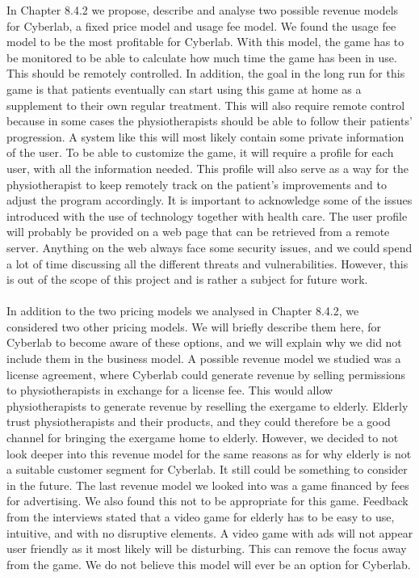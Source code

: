 In Chapter 8.4.2 we propose, describe and analyse two possible revenue models for Cyberlab, a fixed price model and usage fee model. We found the usage fee model to be the most profitable for Cyberlab. With this model, the game has to be monitored to be able to calculate how much time the game has been in use. This should be remotely controlled. In addition, the goal in the long run for this game is that patients eventually can start using this game at home as a supplement to their own regular treatment. This will also require remote control because in some cases the physiotherapists should be able to follow their patients’ progression. A system like this will most likely contain some private information of the user. To be able to customize the game, it will require a profile for each user, with all the information needed. This profile will also serve as a way for the physiotherapist to keep remotely track on the patient’s improvements and to adjust the program accordingly. It is important to acknowledge some of the issues introduced with the use of technology together with health care. The user profile will probably be provided on a web page that can be retrieved from a remote server. Anything on the web always face some security issues, and we could spend a lot of time discussing all the different threats and vulnerabilities. However, this is out of the scope of this project and is rather a subject for future work. \\ \\ 
In addition to the two pricing models we analysed in Chapter 8.4.2, we considered two other pricing models. We will briefly describe them here, for Cyberlab to become aware of these options, and we will explain why we did not include them in the business model. A possible revenue model we studied was a license agreement, where Cyberlab could generate revenue by selling permissions to physiotherapists in exchange for a license fee. This would allow physiotherapists to generate revenue by reselling the exergame to elderly. Elderly trust physiotherapists and their products, and they could therefore be a good channel for bringing the exergame home to elderly. However, we decided to not look deeper into this revenue model for the same reasons as for why elderly is not a suitable customer segment for Cyberlab. It still could be something to consider in the future. The last revenue model we looked into was a game financed by fees for advertising. We also found this not to be appropriate for this game. Feedback from the interviews stated that a video game for elderly has to be easy to use, intuitive, and with no disruptive elements. A video game with ads will not appear user friendly as it most likely will be disturbing. This can remove the focus away from the game. We do not believe this model will ever be an option for Cyberlab. \\ \\
